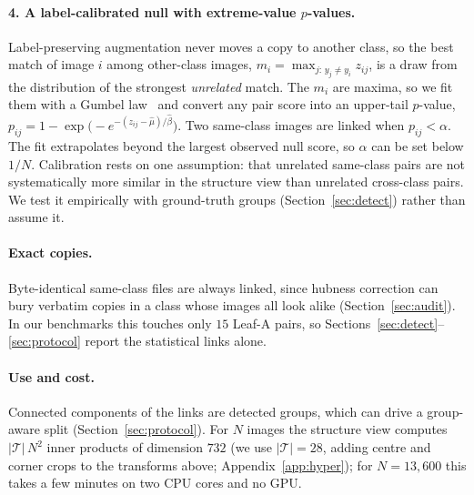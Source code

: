 \paragraph{4. A label-calibrated null with extreme-value $p$-values.}
Label-preserving augmentation never moves a copy to another class, so the best match of image $i$ among other-class images, $m_i=\max_{j:\,y_j\neq y_i} z_{ij}$, is a draw from the distribution of the strongest \emph{unrelated} match. The $m_i$ are maxima, so we fit them with a Gumbel law~\citep{coles2001evt} and convert any pair score into an upper-tail $p$-value, $p_{ij}=1-\exp\!\big(-e^{-(z_{ij}-\hat\mu)/\hat\beta}\big)$. Two same-class images are linked when $p_{ij}<\alpha$. The fit extrapolates beyond the largest observed null score, so $\alpha$ can be set below $1/N$. Calibration rests on one assumption: that unrelated same-class pairs are not systematically more similar in the structure view than unrelated cross-class pairs. We test it empirically with ground-truth groups (Section~\ref{sec:detect}) rather than assume it.

\paragraph{Exact copies.} Byte-identical same-class files are always linked, since hubness correction can bury verbatim copies in a class whose images all look alike (Section~\ref{sec:audit}). In our benchmarks this touches only $15$ Leaf-A pairs, so Sections~\ref{sec:detect}--\ref{sec:protocol} report the statistical links alone.

\paragraph{Use and cost.}
Connected components of the links are detected groups, which can drive a group-aware split (Section~\ref{sec:protocol}). For $N$ images the structure view computes $|\mathcal{T}|\,N^2$ inner products of dimension $732$ (we use $|\mathcal{T}|=28$, adding centre and corner crops to the transforms above; Appendix~\ref{app:hyper}); for $N=13{,}600$ this takes a few minutes on two CPU cores and no GPU.
